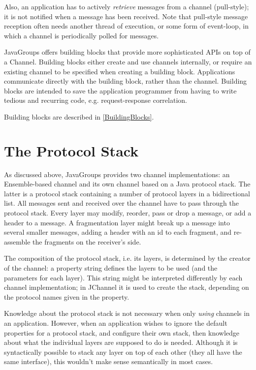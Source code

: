   Also, an application has to actively {\em retrieve} messages from a channel
  (pull-style); it is not notified when a message has been received. Note that
  pull-style message reception often needs another thread of execution, or some form
  of event-loop, in which a channel is periodically polled for messages.

  JavaGroups offers building blocks that provide more sophisticated APIs on top of a
  Channel. Building blocks either create and use channels internally, or require an
  existing channel to be specified when creating a building block. Applications
  communicate directly with the building block, rather than the channel. Building
  blocks are intended to save the application programmer from having to write tedious
  and recurring code, e.g. request-response correlation.

  Building blocks are described in \ref{BuildingBlocks}.
    


  \section{The Protocol Stack}

  As discussed above, JavaGroups provides two channel implementations: an
  Ensemble-based channel and its own channel based on a Java protocol stack. The
  latter is a protocol stack containing a number of protocol layers in a
  bidirectional list. All messages sent and received over the channel have to pass
  through the protocol stack. Every layer may modify, reorder, pass or drop a
  message, or add a header to a message. A fragmentation layer might break up a
  message into several smaller messages, adding a header with an id to each fragment,
  and re-assemble the fragments on the receiver's side.

  The composition of the protocol stack, i.e. its layers, is determined by the
  creator of the channel: a property string defines the layers to be used (and the
  parameters for each layer). This string might be interpreted differently by each
  channel implementation; in JChannel it is used to create the stack, depending on
  the protocol names given in the property.

  Knowledge about the protocol stack is not necessary when only {\em using}
  channels in an application. However, when an application wishes to ignore the
  default properties for a protocol stack, and configure their own stack, then
  knowledge about what the individual layers are supposed to do is needed. Although
  it is syntactically possible to stack any layer on top of each other (they all
  have the same interface), this wouldn't make sense semantically in most cases.


